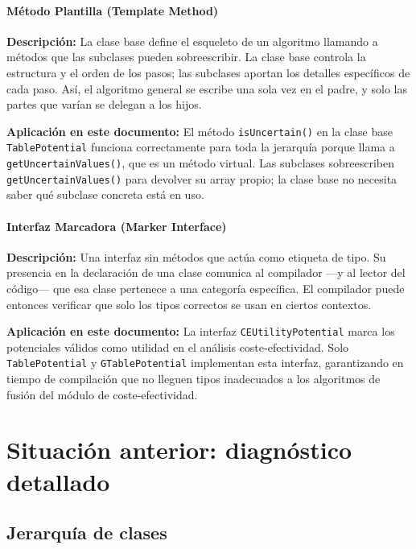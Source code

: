 \documentclass[11pt,a4paper]{article}
\newcommand{\code}[1]{\texttt{#1}}
\begin{document}
\label{sec:fund-template-method}
\paragraph{Método Plantilla (Template Method)}

\textbf{Descripción:} La clase base define el esqueleto de un algoritmo
llamando a métodos que las subclases pueden sobreescribir.  La clase base
controla la estructura y el orden de los pasos; las subclases aportan los
detalles específicos de cada paso.  Así, el algoritmo general se escribe
una sola vez en el padre, y solo las partes que varían se delegan a los hijos.

\textbf{Aplicación en este documento:} El método \code{isUncertain()} en la
clase base \code{TablePotential} funciona correctamente para toda la jerarquía
porque llama a \code{getUncertainValues()}, que es un método virtual.  Las
subclases sobreescriben \code{getUncertainValues()} para devolver su array
propio; la clase base no necesita saber qué subclase concreta está en uso.

\label{sec:fund-marker-interface}
\paragraph{Interfaz Marcadora (Marker Interface)}

\textbf{Descripción:} Una interfaz sin métodos que actúa como etiqueta de tipo.
Su presencia en la declaración de una clase comunica al compilador ---y al
lector del código--- que esa clase pertenece a una categoría específica.  El
compilador puede entonces verificar que solo los tipos correctos se usan en
ciertos contextos.

\textbf{Aplicación en este documento:} La interfaz \code{CEUtilityPotential}
marca los potenciales válidos como utilidad en el análisis coste-efectividad.
Solo \code{TablePotential} y \code{GTablePotential} implementan esta interfaz,
garantizando en tiempo de compilación que no lleguen tipos inadecuados a los
algoritmos de fusión del módulo de coste-efectividad.

\section{Situación anterior: diagnóstico detallado}

\subsection{Jerarquía de clases}
\end{document}
